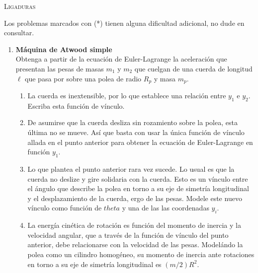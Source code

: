\documentclass[11pt, spanish, a4paper, twoside]{article}
\begin{document}
\begin{center}
  \textsc{\large Ligaduras}
\end{center}

\noindent
Los problemas marcados con (*) tienen alguna dificultad adicional, no dude en consultar.

\begin{enumerate}

\item 
	\begin{minipage}[t][11cm]{0.7\textwidth}
		\textbf{Máquina de Atwood simple}\\
		Obtenga a partir de la ecuación de Euler-Lagrange la aceleración que presentan las pesas de masas \(m_1\) y \(m_2\) que cuelgan de una cuerda de longitud \(\ell\) que pasa por sobre una polea de radio \(R_p\) y masa \(m_p\).
		\begin{enumerate}
			\item La cuerda es inextensible, por lo que establece una relación entre \(y_1\) e \(y_2\).
			Escriba esta función de vínculo.
			\item De asumirse que la cuerda desliza sin rozamiento sobre la polea, esta última no se mueve.
			Así que basta con usar la única función de vínculo allada en el punto anterior para obtener la ecuación de Euler-Lagrange en función \(y_1\).
			\item Lo que plantea el punto anterior rara vez sucede.
			Lo usual es que la cuerda no deslize y gire solidaria con la cuerda.
			Esto es un vínculo entre el ángulo que describe la polea en torno a su eje de simetría longitudinal y el desplazamiento de la cuerda, ergo de las pesas.
			Modele este nuevo vínculo como  función de \(theta\) y una de las 
			las coordenadas \(y_i\).
			\item La energía cinética de rotación es función del momento de inercia y la velocidad angular, que a través de la función de vínculo del punto anterior, debe relacionarse con la velocidad de las pesas.
			Modelándo la polea como un cilindro homogéneo, su momento de inercia ante rotaciones en torno a su eje de simetría longitudinal es \((m/2) R^2\).
		\end{enumerate}
	\end{minipage}
	\begin{minipage}[c][0cm][t]{0.2\textwidth}
		
	\end{minipage}


\end{enumerate}
\end{document}

